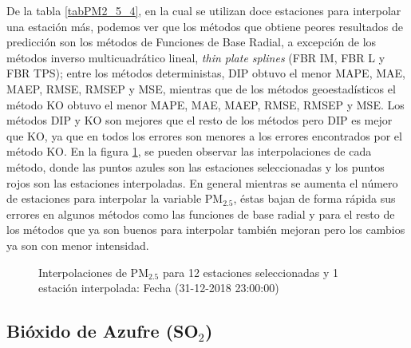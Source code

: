De la tabla \ref{tabPM2_5_4}, en la cual se utilizan doce estaciones para interpolar una estación más, podemos ver que los métodos que obtiene peores resultados de predicción son los métodos de Funciones de Base Radial, a excepción de los métodos inverso multicuadrático lineal, {\em thin plate splines} (FBR IM, FBR L y FBR TPS); entre los métodos deterministas, DIP obtuvo el menor MAPE, MAE, MAEP, RMSE, RMSEP y MSE, mientras que de los métodos geoestadísticos el método KO obtuvo el menor MAPE, MAE, MAEP, RMSE, RMSEP y MSE. Los métodos DIP y KO son mejores que el resto de los métodos pero DIP es mejor que KO, ya que en todos los errores son menores a los errores encontrados por el método KO. En la figura \ref{PM25figure4}, se pueden observar las interpolaciones de cada método, donde las puntos azules son las estaciones seleccionadas y los puntos rojos son las estaciones interpoladas. En general mientras se aumenta el número de estaciones para interpolar la variable PM$_{2.5}$, éstas bajan de forma rápida sus errores en algunos métodos como las funciones de base radial y para el resto de los métodos que ya son buenos para interpolar también mejoran pero los cambios ya son con menor intensidad.


\begin{figure}[H]
\centering
{}
\subfigure[KO] {\texttt{[image: ./ok\_12\_6\_26302]}}
\subfigure[KU] {\texttt{[image: ./uk\_12\_6\_26302]}}
\caption{Interpolaciones de PM$_{2.5}$ para 12 estaciones seleccionadas y 1 estación interpolada: Fecha (31-12-2018 23:00:00)}
\label{PM25figure4}
\end{figure}





\subsection{Bióxido de Azufre (SO$_{2}$)}


